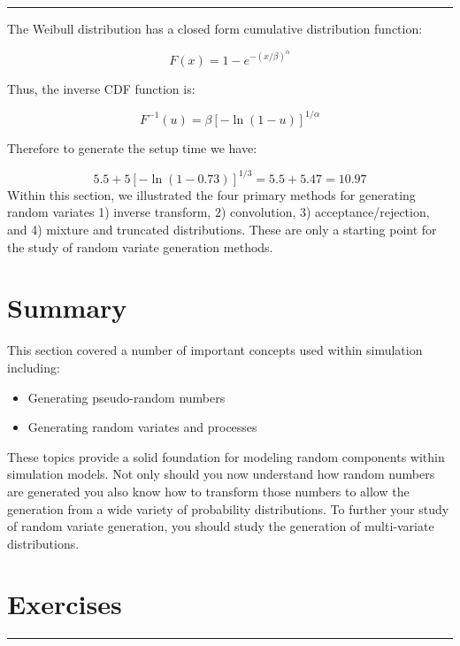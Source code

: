 \documentclass[
]{book}
\theoremstyle{definition}
\theoremstyle{definition}
\theoremstyle{definition}
\theoremstyle{definition}
\theoremstyle{remark}
\begin{document}
\begin{center}\rule{0.5\linewidth}{0.5pt}\end{center}

The Weibull distribution has a closed form cumulative distribution
function:

\[
F(x) = 1- e^{-(x/\beta)^\alpha}
\]

Thus, the inverse CDF function is:

\[
F^{-1}(u) = \beta\left[ -\ln (1-u)\right]^{1/\alpha}
\]

Therefore to generate the setup time we have:

\[
5.5 + 5\left[ -\ln (1-0.73)\right]^{1/3} = 5.5+ 5.47= 10.97
\]
Within this section, we illustrated the four primary methods for generating random variates 1) inverse transform, 2) convolution, 3) acceptance/rejection, and 4) mixture and truncated distributions. These are only a starting point for the study of random variate generation methods.

\hypertarget{summary-1}{%
\section{Summary}\label{summary-1}}

This section covered a number of important concepts used within
simulation including:

\begin{itemize}
\item
  Generating pseudo-random numbers
\item
  Generating random variates and processes
\end{itemize}

These topics provide a solid foundation for modeling random components
within simulation models. Not only should you now understand how
random numbers are generated you also know how to transform those
numbers to allow the generation from a wide variety of probability
distributions. To further your study of random variate generation, you should study the generation of multi-variate distributions.

\hypertarget{exercises-1}{%
\section{Exercises}\label{exercises-1}}

\begin{center}\rule{0.5\linewidth}{0.5pt}\end{center}
\end{document}
